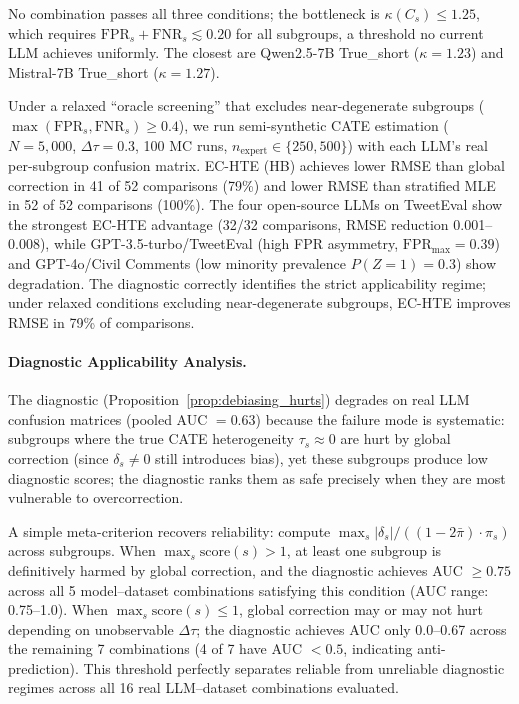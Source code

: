 No combination passes all three conditions; the bottleneck is $\kappa(C_s) \leq 1.25$, which requires $\mathrm{FPR}_s + \mathrm{FNR}_s \lesssim 0.20$ for all subgroups, a threshold no current LLM achieves uniformly.
The closest are Qwen2.5-7B True\_short ($\kappa{=}1.23$) and Mistral-7B True\_short ($\kappa{=}1.27$).

Under a relaxed ``oracle screening'' that excludes near-degenerate subgroups ($\max(\mathrm{FPR}_s, \mathrm{FNR}_s) \geq 0.4$), we run semi-synthetic CATE estimation ($N{=}5{,}000$, $\Delta\tau{=}0.3$, 100 MC runs, $n_{\text{expert}} \in \{250, 500\}$) with each LLM's real per-subgroup confusion matrix.
EC-HTE (HB) achieves lower RMSE than global correction in 41 of 52 comparisons (79\%) and lower RMSE than stratified MLE in 52 of 52 comparisons (100\%).
The four open-source LLMs on TweetEval show the strongest EC-HTE advantage (32/32 comparisons, RMSE reduction 0.001--0.008), while GPT-3.5-turbo/TweetEval (high FPR asymmetry, $\mathrm{FPR}_{\max}{=}0.39$) and GPT-4o/Civil Comments (low minority prevalence $P(Z{=}1){=}0.3$) show degradation.
The diagnostic correctly identifies the strict applicability regime; under relaxed conditions excluding near-degenerate subgroups, EC-HTE improves RMSE in 79\% of comparisons.

\paragraph{Diagnostic Applicability Analysis.}
The diagnostic (Proposition~\ref{prop:debiasing_hurts}) degrades on real LLM confusion matrices (pooled AUC $= 0.63$) because the failure mode is systematic: subgroups where the true CATE heterogeneity $\tau_s \approx 0$ are hurt by global correction (since $\delta_s \neq 0$ still introduces bias), yet these subgroups produce low diagnostic scores; the diagnostic ranks them as safe precisely when they are most vulnerable to overcorrection.

A simple meta-criterion recovers reliability: compute $\max_s |\delta_s| / ((1 - 2\bar{\pi}) \cdot \pi_s)$ across subgroups.
When $\max_s \mathrm{score}(s) > 1$, at least one subgroup is definitively harmed by global correction, and the diagnostic achieves AUC $\geq 0.75$ across all 5 model--dataset combinations satisfying this condition (AUC range: 0.75--1.0).
When $\max_s \mathrm{score}(s) \leq 1$, global correction may or may not hurt depending on unobservable $\Delta\tau$; the diagnostic achieves AUC only 0.0--0.67 across the remaining 7 combinations (4 of 7 have AUC $< 0.5$, indicating anti-prediction).
This threshold perfectly separates reliable from unreliable diagnostic regimes across all 16 real LLM--dataset combinations evaluated.

